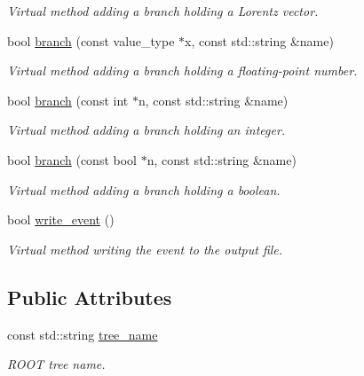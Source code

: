 \begin{DoxyCompactItemize}
\begin{DoxyCompactList}\small\item\em Virtual method adding a branch holding a Lorentz vector. \end{DoxyCompactList}\item 
\hypertarget{a00470_a1eb58837e2275b9ec56fcd98b943a21d}{bool \hyperlink{a00470_a1eb58837e2275b9ec56fcd98b943a21d}{branch} (const value\-\_\-type $\ast$x, const std\-::string \&name)}\label{a00470_a1eb58837e2275b9ec56fcd98b943a21d}

\begin{DoxyCompactList}\small\item\em Virtual method adding a branch holding a floating-\/point number. \end{DoxyCompactList}\item 
\hypertarget{a00470_a8f0f5e963b9ab9dc9d4f9318a6a7cbf6}{bool \hyperlink{a00470_a8f0f5e963b9ab9dc9d4f9318a6a7cbf6}{branch} (const int $\ast$n, const std\-::string \&name)}\label{a00470_a8f0f5e963b9ab9dc9d4f9318a6a7cbf6}

\begin{DoxyCompactList}\small\item\em Virtual method adding a branch holding an integer. \end{DoxyCompactList}\item 
\hypertarget{a00470_a75478ad9b737d76ea983ecc1583d6bce}{bool \hyperlink{a00470_a75478ad9b737d76ea983ecc1583d6bce}{branch} (const bool $\ast$n, const std\-::string \&name)}\label{a00470_a75478ad9b737d76ea983ecc1583d6bce}

\begin{DoxyCompactList}\small\item\em Virtual method adding a branch holding a boolean. \end{DoxyCompactList}\item 
\hypertarget{a00470_a9be150afdc00d9d7b3c9db35f5494968}{bool \hyperlink{a00470_a9be150afdc00d9d7b3c9db35f5494968}{write\-\_\-event} ()}\label{a00470_a9be150afdc00d9d7b3c9db35f5494968}

\begin{DoxyCompactList}\small\item\em Virtual method writing the event to the output file. \end{DoxyCompactList}\end{DoxyCompactItemize}
\subsection*{Public Attributes}
\begin{DoxyCompactItemize}
\item 
\hypertarget{a00470_aec66ac94eb5969f4d22f50c1d1db2ba5}{const std\-::string \hyperlink{a00470_aec66ac94eb5969f4d22f50c1d1db2ba5}{tree\-\_\-name}}\label{a00470_aec66ac94eb5969f4d22f50c1d1db2ba5}

\begin{DoxyCompactList}\small\item\em R\-O\-O\-T tree name. \end{DoxyCompactList}\end{DoxyCompactItemize}


